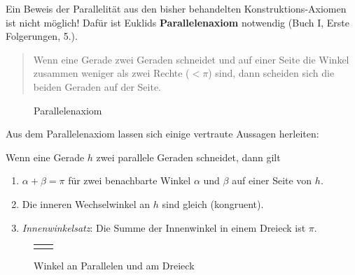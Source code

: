 Ein Beweis der Parallelität aus den bisher behandelten Konstruktions-Axiomen ist nicht möglich!
Dafür ist Euklids {\bf Parallelenaxiom} notwendig (Buch I, Erste Folgerungen, 5.).
\begin{quote}
Wenn eine Gerade %
zwei Geraden %
schneidet und auf einer Seite die Winkel
zusammen weniger als zwei Rechte ($<\pi$) sind, dann scheiden sich die beiden Geraden auf der Seite.
\end{quote}

\begin{center}
    \begin{figure}[h]
        
        \caption{Parallelenaxiom}
    \end{figure}
\end{center}

Aus dem Parallelenaxiom lassen sich einige vertraute Aussagen herleiten:

\begin{thm}
    Wenn eine Gerade $h$ zwei parallele Geraden %
    schneidet, dann gilt
    \begin{enumerate}
        \item $\alpha + \beta = \pi$ für zwei benachbarte Winkel $\alpha$ und $\beta$  auf einer
        Seite von $h$.
        \item Die inneren Wechselwinkel an $h$ sind gleich (kongruent).
        \item {\em Innenwinkelsatz}: Die Summe der Innenwinkel in einem Dreieck ist $\pi$.
    \end{enumerate}
\end{thm}

\begin{center}
    \begin{figure}[h]
        \begin{tabular}{cc}
            
            &
            
        \end{tabular}
        \caption{Winkel an Parallelen und am Dreieck}
    \end{figure}
\end{center}


